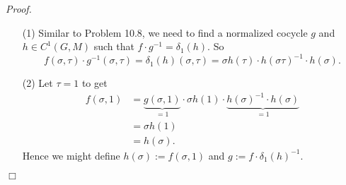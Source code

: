 \documentclass{article}
\begin{document}
\emph{Proof.}
\begin{enumerate}
\item[(1)]
  Similar to Problem 10.8, we need to find a normalized cocycle $g$
  and $h \in C^{1}(G,M)$
  such that $f \cdot g^{-1} = \delta_1(h)$.
  So
  \[
    f(\sigma,\tau) \cdot g^{-1}(\sigma,\tau)
    = \delta_1(h)(\sigma,\tau)
    = \sigma h(\tau) \cdot h(\sigma\tau)^{-1} \cdot h(\sigma).
  \]

\item[(2)]
  Let $\tau = 1$ to get
  \begin{align*}
    f(\sigma,1)
    &= \underbrace{g(\sigma,1)}_{= 1} \cdot \sigma h(1)
        \cdot \underbrace{h(\sigma)^{-1} \cdot h(\sigma)}_{= 1} \\
    &= \sigma h(1) \\
    &= h(\sigma).
  \end{align*}
  Hence we might define $h(\sigma) := f(\sigma,1)$
  and $g := f \cdot \delta_1(h)^{-1}$.
\end{enumerate}
$\Box$ \\\\






\end{document}
